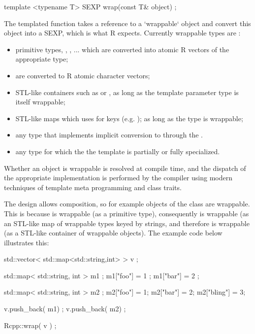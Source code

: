 \begin{example}
template <typename T> 
SEXP wrap(const T& object) ;
\end{example}

The templated function takes a reference to a `wrappable` 
object and convert this object into a SEXP, which is what R expects. 
Currently wrappable types are :
\begin{itemize}
\item primitive types, , , ... which are converted 
into atomic R vectors of the appropriate type;
\item {} are converted to R atomic character vectors;
\item STL-like containers such as  or , 
as long as the template parameter type  is itself wrappable;
\item STL-like maps which uses  for keys 
(e.g. ); as long as 
the type  is wrappable;
\item any type that implements implicit conversion to  through the 
.
\item any type for which the the  template is partially or fully 
specialized.
\end{itemize}

Whether an object is wrappable is resolved at compile time, and the 
dispatch of the appropriate implementation is performed by the compiler
using modern techniques of template meta programming and class traits.

The design allows composition, so for example objects of the class
 are wrappable. This is 
because  is wrappable (as a primitive type), consequently 
 is wrappable (as an STL-like map of 
wrappable types keyed by strings, and therefore
 is wrappable (as a 
STL-like container of wrappable objects). The example code below
illustrates this: 

\begin{example}
std::vector< std::map<std::string,int> > v ;

std::map< std::string, int > m1 ;
m1["foo"] = 1 ; m1["bar"] = 2 ;

std::map< std::string, int > m2 ;
m2["foo"] = 1; m2["bar"] = 2; m2["bling"] = 3;

v.push_back( m1) ;
v.push_back( m2) ;

Rcpp::wrap( v ) ;
\end{example}

